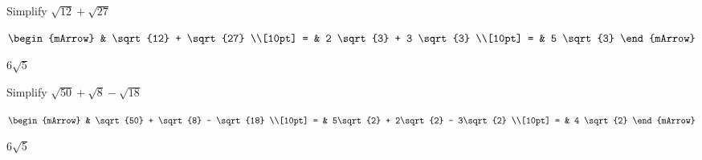 \begin{mtask}[resume]
   \task \begin{exercise} Simplify $\sqrt{12} + \sqrt {27}$
           \begin{envSolution}
             $\begin{mArrow}
                    & \sqrt{12} + \sqrt{27}              \\[10pt]
		   		  = &  2 \sqrt{3} + 3 \sqrt {3}           \\[10pt]
				  = &  5 \sqrt {3} 
              \end{mArrow}$
            \begin{shortsolution}  
			     $ 6 \sqrt {5} $
			\end{shortsolution}				 
           \end{envSolution}
         \end{exercise}
   \task \begin{exercise} Simplify $\sqrt{50} + \sqrt {8} - \sqrt{18}$
           \begin{envSolution}
             $\begin{mArrow}
                    & \sqrt{50} + \sqrt {8} - \sqrt{18}              \\[10pt]
		   		  = & 5\sqrt{2} + 2\sqrt {2} - 3\sqrt{2}         \\[10pt]
				  = &  4 \sqrt {2} 
              \end{mArrow}$
            \begin{shortsolution}  
			     $ 6 \sqrt {5} $
			\end{shortsolution}				 
           \end{envSolution}
         \end{exercise}
\end{mtask}

